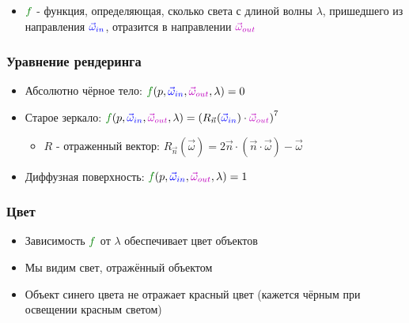 \documentclass{beamer}
\begin{document}
\begin{frame}[fragile]
\begin{itemize}
\pause
\item \begin{math}{\color{green}f}\end{math} - функция, определяющая, сколько света с длиной волны \begin{math}\lambda\end{math}, пришедшего из направления \begin{math}{\color{blue}\vec\omega_{in}}\end{math}, отразится в направлении \begin{math}{\color{magenta}\vec\omega_{out}}\end{math}
\end{itemize}
\end{frame}

\begin{frame}[fragile]
\frametitle{Уравнение рендеринга}
\begin{itemize}
\item Абсолютно чёрное тело: \begin{math}{\color{green}f}(p, {\color{blue}\vec\omega_{in}}, {\color{magenta}\vec\omega_{out}}, \lambda) = 0\end{math}
\pause
\item Старое зеркало: \begin{math}{\color{green}f}(p, {\color{blue}\vec\omega_{in}}, {\color{magenta}\vec\omega_{out}}, \lambda) = \left(R_{\vec n}({\color{blue}\vec\omega_{in}})\cdot{\color{magenta}\vec\omega_{out}}\right)^7\end{math}
\begin{itemize}
\item \begin{math}R\end{math} - отраженный вектор: \begin{math}R_{\vec n}(\vec \omega) = 2\vec n \cdot (\vec n \cdot \vec \omega) - \vec \omega\end{math}
\end{itemize}
\pause
\item Диффузная поверхность: \begin{math}{\color{green}f}(p, {\color{blue}\vec\omega_{in}}, {\color{magenta}\vec\omega_{out}}, \lambda) = 1\end{math}
\end{itemize}
\end{frame}

\begin{frame}[fragile]
\frametitle{Цвет}
\begin{itemize}
\item Зависимость \begin{math}{\color{green}f}\end{math} от \begin{math}\lambda\end{math} обеспечивает цвет объектов
\pause
\item Мы видим свет, отражённый объектом
\item Объект синего цвета не отражает красный цвет (кажется чёрным при освещении красным светом)
\end{itemize}
\end{frame}
\end{document}
